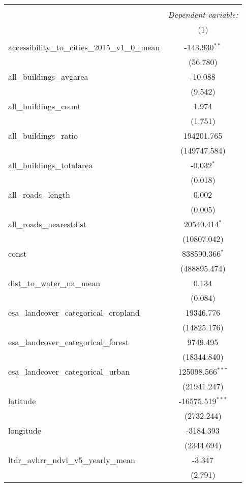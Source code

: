 \begin{table}[!htbp] \centering
\begin{tabular}{@{\extracolsep{5pt}}lc}
\\[-1.8ex]\hline
\hline \\[-1.8ex]
& \multicolumn{1}{c}{\textit{Dependent variable:}} \
\cr \cline{1-2}
\\[-1.8ex] & (1) \\
\hline \\[-1.8ex]
 accessibility_to_cities_2015_v1_0_mean & -143.930$^{**}$ \\
  & (56.780) \\
 all_buildings_avgarea & -10.088$^{}$ \\
  & (9.542) \\
 all_buildings_count & 1.974$^{}$ \\
  & (1.751) \\
 all_buildings_ratio & 194201.765$^{}$ \\
  & (149747.584) \\
 all_buildings_totalarea & -0.032$^{*}$ \\
  & (0.018) \\
 all_roads_length & 0.002$^{}$ \\
  & (0.005) \\
 all_roads_nearestdist & 20540.414$^{*}$ \\
  & (10807.042) \\
 const & 838590.366$^{*}$ \\
  & (488895.474) \\
 dist_to_water_na_mean & 0.134$^{}$ \\
  & (0.084) \\
 esa_landcover_categorical_cropland & 19346.776$^{}$ \\
  & (14825.176) \\
 esa_landcover_categorical_forest & 9749.495$^{}$ \\
  & (18344.840) \\
 esa_landcover_categorical_urban & 125098.566$^{***}$ \\
  & (21941.247) \\
 latitude & -16575.519$^{***}$ \\
  & (2732.244) \\
 longitude & -3184.393$^{}$ \\
  & (2344.694) \\
 ltdr_avhrr_ndvi_v5_yearly_mean & -3.347$^{}$ \\
  & (2.791) \\

\end{tabular}
\end{table}
